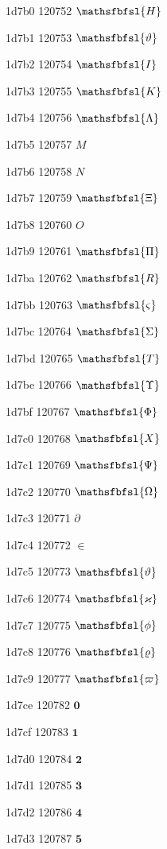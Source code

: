\documentclass[11pt]{article}
\begin{document}
1d7b0 120752 \ensuremath{\mathsfbfsl{H}}

1d7b1 120753 \ensuremath{\mathsfbfsl{\vartheta}}

1d7b2 120754 \ensuremath{\mathsfbfsl{I}}

1d7b3 120755 \ensuremath{\mathsfbfsl{K}}

1d7b4 120756 \ensuremath{\mathsfbfsl{\Lambda}}

1d7b5 120757 \ensuremath{M}

1d7b6 120758 \ensuremath{N}

1d7b7 120759 \ensuremath{\mathsfbfsl{\Xi}}

1d7b8 120760 \ensuremath{O}

1d7b9 120761 \ensuremath{\mathsfbfsl{\Pi}}

1d7ba 120762 \ensuremath{\mathsfbfsl{R}}

1d7bb 120763 \ensuremath{\mathsfbfsl{\varsigma}}

1d7bc 120764 \ensuremath{\mathsfbfsl{\Sigma}}

1d7bd 120765 \ensuremath{\mathsfbfsl{T}}

1d7be 120766 \ensuremath{\mathsfbfsl{\Upsilon}}

1d7bf 120767 \ensuremath{\mathsfbfsl{\Phi}}

1d7c0 120768 \ensuremath{\mathsfbfsl{X}}

1d7c1 120769 \ensuremath{\mathsfbfsl{\Psi}}

1d7c2 120770 \ensuremath{\mathsfbfsl{\Omega}}

1d7c3 120771 \ensuremath{\partial}

1d7c4 120772 \ensuremath{\in}

1d7c5 120773 \ensuremath{\mathsfbfsl{\vartheta}}

1d7c6 120774 \ensuremath{\mathsfbfsl{\varkappa}}

1d7c7 120775 \ensuremath{\mathsfbfsl{\phi}}

1d7c8 120776 \ensuremath{\mathsfbfsl{\varrho}}

1d7c9 120777 \ensuremath{\mathsfbfsl{\varpi}}

1d7ce 120782 \ensuremath{\mathbf{0}}

1d7cf 120783 \ensuremath{\mathbf{1}}

1d7d0 120784 \ensuremath{\mathbf{2}}

1d7d1 120785 \ensuremath{\mathbf{3}}

1d7d2 120786 \ensuremath{\mathbf{4}}

1d7d3 120787 \ensuremath{\mathbf{5}}
\end{document}
